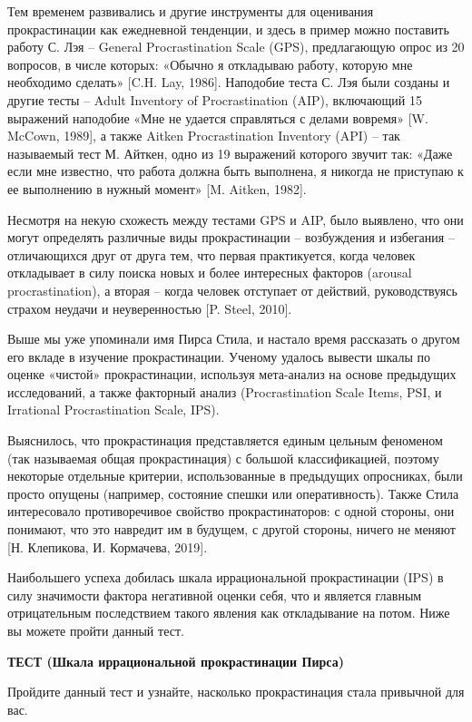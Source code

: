 Тем временем развивались и другие инструменты для оценивания прокрастинации как ежедневной тенденции, и здесь в пример можно поставить работу С. Лэя – General Procrastination Scale (GPS), предлагающую опрос из 20 вопросов, в числе которых: «Обычно я откладываю работу, которую мне необходимо сделать» [C.H. Lay, 1986]. Наподобие теста С. Лэя были созданы и другие тесты – Adult Inventory of Procrastination (AIP), включающий 15 выражений наподобие «Мне не удается справляться с делами вовремя» [W. McCown, 1989], а также Aitken Procrastination Inventory (API) – так называемый тест М. Айткен, одно из 19 выражений которого звучит так: «Даже если мне известно, что работа должна быть выполнена, я никогда не приступаю к ее выполнению в нужный момент» [M. Aitken, 1982].

Несмотря на некую схожесть между тестами GPS и AIP, было выявлено, что они могут определять различные виды прокрастинации – возбуждения и избегания – отличающихся друг от друга тем, что первая практикуется, когда человек откладывает в силу поиска новых и более интересных факторов (arousal procrastination), а вторая – когда человек отступает от действий, руководствуясь страхом неудачи и неуверенностью [P. Steel, 2010].

Выше мы уже упоминали имя Пирса Стила, и настало время рассказать о другом его вкладе в изучение прокрастинации. Ученому удалось вывести шкалы по оценке «чистой» прокрастинации, используя мета-анализ на основе предыдущих исследований, а также факторный анализ (Procrastination Scale Items, PSI, и Irrational Procrastination Scale, IPS).

Выяснилось, что прокрастинация представляется единым цельным феноменом (так называемая общая прокрастинация) с большой классификацией, поэтому некоторые отдельные критерии, использованные в предыдущих опросниках, были просто опущены (например, состояние спешки или оперативность). Также Стила интересовало противоречивое свойство прокрастинаторов: с одной стороны, они понимают, что это навредит им в будущем, с другой стороны, ничего не меняют [Н. Клепикова, И. Кормачева, 2019].

Наибольшего успеха добилась шкала иррациональной прокрастинации (IPS) в силу значимости фактора негативной оценки себя, что и является главным отрицательным последствием такого явления как откладывание на потом. Ниже вы можете пройти данный тест.

\textbf{ТЕСТ (Шкала иррациональной прокрастинации Пирса)}

Пройдите данный тест и узнайте, насколько прокрастинация стала привычной для вас.

